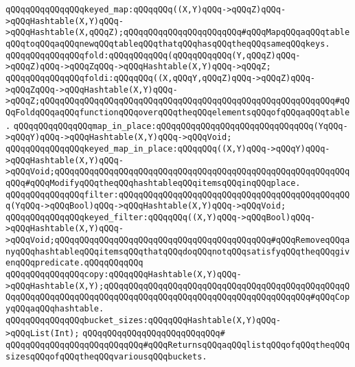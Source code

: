 \verb|qQQqqQQqqQQqqQQqkeyed_map:qQQqqQQq((X,Y)qQQq->qQQqZ)qQQq->qQQqHashtable(X,Y)qQQq->qQQqHashtable(X,qQQqZ);qQQqqQQqqQQqqQQqqQQqqQQq#qQQqMapqQQqaqQQqtableqQQqtoqQQqaqQQqnewqQQqtableqQQqthatqQQqhasqQQqtheqQQqsameqQQqkeys.|\newline
\newline
\verb|qQQqqQQqqQQqqQQqfold:qQQqqQQqqQQq(qQQqqQQqqQQq(Y,qQQqZ)qQQq->qQQqZ)qQQq->qQQqZqQQq->qQQqHashtable(X,Y)qQQq->qQQqZ;|\newline
\verb|qQQqqQQqqQQqqQQqfoldi:qQQqqQQq((X,qQQqY,qQQqZ)qQQq->qQQqZ)qQQq->qQQqZqQQq->qQQqHashtable(X,Y)qQQq->qQQqZ;qQQqqQQqqQQqqQQqqQQqqQQqqQQqqQQqqQQqqQQqqQQqqQQqqQQqqQQqqQQq#qQQqFoldqQQqaqQQqfunctionqQQqoverqQQqtheqQQqelementsqQQqofqQQqaqQQqtable.|\newline
\newline
\verb|qQQqqQQqqQQqqQQqmap_in_place:qQQqqQQqqQQqqQQqqQQqqQQqqQQqqQQq(YqQQq->qQQqY)qQQq->qQQqHashtable(X,Y)qQQq->qQQqVoid;|\newline
\verb|qQQqqQQqqQQqqQQqkeyed_map_in_place:qQQqqQQq((X,Y)qQQq->qQQqY)qQQq->qQQqHashtable(X,Y)qQQq->qQQqVoid;qQQqqQQqqQQqqQQqqQQqqQQqqQQqqQQqqQQqqQQqqQQqqQQqqQQqqQQqqQQqqQQq#qQQqModifyqQQqtheqQQqhashtableqQQqitemsqQQqinqQQqplace.|\newline
\newline
\verb|qQQqqQQqqQQqqQQqfilter:qQQqqQQqqQQqqQQqqQQqqQQqqQQqqQQqqQQqqQQqqQQqqQQq(YqQQq->qQQqBool)qQQq->qQQqHashtable(X,Y)qQQq->qQQqVoid;|\newline
\verb|qQQqqQQqqQQqqQQqkeyed_filter:qQQqqQQq((X,Y)qQQq->qQQqBool)qQQq->qQQqHashtable(X,Y)qQQq->qQQqVoid;qQQqqQQqqQQqqQQqqQQqqQQqqQQqqQQqqQQqqQQqqQQq#qQQqRemoveqQQqanyqQQqhashtableqQQqitemsqQQqthatqQQqdoqQQqnotqQQqsatisfyqQQqtheqQQqgivenqQQqpredicate.qQQqqQQqqQQq|\newline
\newline
\newline
\verb|qQQqqQQqqQQqqQQqcopy:qQQqqQQqHashtable(X,Y)qQQq->qQQqHashtable(X,Y);qQQqqQQqqQQqqQQqqQQqqQQqqQQqqQQqqQQqqQQqqQQqqQQqqQQqqQQqqQQqqQQqqQQqqQQqqQQqqQQqqQQqqQQqqQQqqQQqqQQqqQQqqQQqqQQq#qQQqCopyqQQqaqQQqhashtable.|\newline
\newline
\verb|qQQqqQQqqQQqqQQqbucket_sizes:qQQqqQQqHashtable(X,Y)qQQq->qQQqList(Int);|\newline
\verb|qQQqqQQqqQQqqQQqqQQqqQQqqQQq#|\newline
\verb|qQQqqQQqqQQqqQQqqQQqqQQqqQQq#qQQqReturnsqQQqaqQQqlistqQQqofqQQqtheqQQqsizesqQQqofqQQqtheqQQqvariousqQQqbuckets.|\newline
